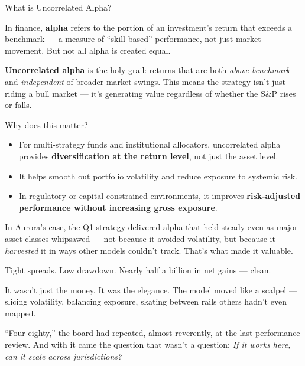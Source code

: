 \begin{TechnicalSidebar}{What is Uncorrelated Alpha?}

  In finance, \textbf{alpha} refers to the portion of an investment’s return that exceeds a benchmark — a measure of 
  “skill-based” performance, not just market movement. But not all alpha is created equal.
  
  \medskip
  
  \textbf{Uncorrelated alpha} is the holy grail: returns that are both \textit{above benchmark} and \textit{independent} 
  of broader market swings. This means the strategy isn't just riding a bull market — it’s generating value regardless 
  of whether the S\&P rises or falls.
  
  \medskip
  
  Why does this matter?

  \medskip
  
  \begin{itemize}
    \item For multi-strategy funds and institutional allocators, uncorrelated alpha provides \textbf{diversification 
    at the return level}, not just the asset level.
    \item It helps smooth out portfolio volatility and reduce exposure to systemic risk.
    \item In regulatory or capital-constrained environments, it improves \textbf{risk-adjusted performance without 
    increasing gross exposure}.
  \end{itemize}
  
  \medskip
  
  In Aurora’s case, the Q1 strategy delivered alpha that held steady even as major asset classes whipsawed — not because 
  it avoided volatility, but because it \textit{harvested} it in ways other models couldn't track. That’s what made 
  it valuable.
  
\end{TechnicalSidebar}

\medskip


Tight spreads.
Low drawdown.
Nearly half a billion in net gains — clean.

It wasn’t just the money. It was the elegance.
The model moved like a scalpel — slicing volatility, balancing exposure, skating between rails others hadn’t even mapped.

“Four-eighty,” the board had repeated, almost reverently, at the last performance review.
And with it came the question that wasn’t a question:
\textit{If it works here, can it scale across jurisdictions?}


